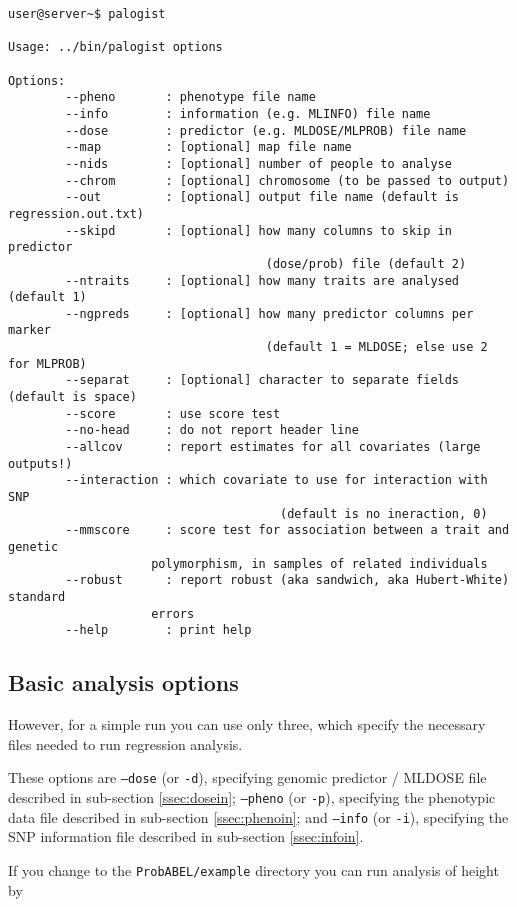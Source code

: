 \documentclass[12pt]{article}
\begin{document}
\begin{verbatim}
user@server~$ palogist

Usage: ../bin/palogist options

Options:
		--pheno       : phenotype file name
		--info        : information (e.g. MLINFO) file name
		--dose        : predictor (e.g. MLDOSE/MLPROB) file name
		--map         : [optional] map file name
		--nids        : [optional] number of people to analyse
		--chrom       : [optional] chromosome (to be passed to output)
		--out         : [optional] output file name (default is regression.out.txt)
		--skipd       : [optional] how many columns to skip in predictor
								    (dose/prob) file (default 2)
		--ntraits     : [optional] how many traits are analysed (default 1)
		--ngpreds     : [optional] how many predictor columns per marker
								    (default 1 = MLDOSE; else use 2 for MLPROB)
		--separat     : [optional] character to separate fields (default is space)
		--score       : use score test
		--no-head     : do not report header line
		--allcov      : report estimates for all covariates (large outputs!)
		--interaction : which covariate to use for interaction with SNP
									  (default is no ineraction, 0)
		--mmscore     : score test for association between a trait and genetic
                    polymorphism, in samples of related individuals	
		--robust      : report robust (aka sandwich, aka Hubert-White) standard 
                    errors
		--help        : print help

\end{verbatim}


\subsection{Basic analysis options}
However, for 
a simple run you can use only three, which specify the necessary files 
needed to run regression analysis.

These options are 
\texttt{--dose} (or \texttt{-d}), 
specifying genomic predictor / MLDOSE file described in sub-section \ref{ssec:dosein};
\texttt{--pheno} (or \texttt{-p}), 
specifying the phenotypic data file described in sub-section \ref{ssec:phenoin}; and
\texttt{--info} (or \texttt{-i}), 
specifying the SNP information file described in sub-section \ref{ssec:infoin}.

If you change to the \texttt{ProbABEL/example} directory you can run analysis of 
height by 
\end{document}
